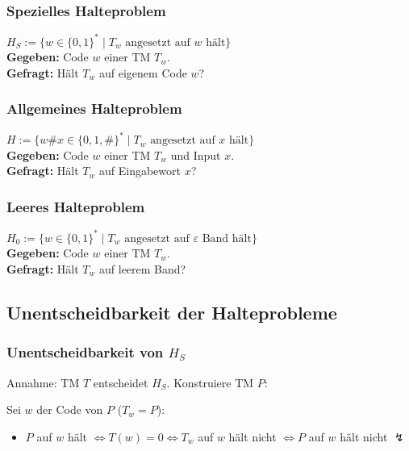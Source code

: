 \subsubsection{Spezielles Halteproblem}
$H_S := \{w \in \{0,1\}^* \mid T_w \text{ angesetzt auf } w \text{ hält}\}$\\
\textbf{Gegeben:} Code $w$ einer TM $T_w$. \\
\textbf{Gefragt:} Hält $T_w$ auf eigenem Code $w$?

\subsubsection{Allgemeines Halteproblem}
$H := \{w\#x \in \{0,1,\#\}^* \mid T_w \text{ angesetzt auf } x \text{ hält}\}$\\
\textbf{Gegeben:} Code $w$ einer TM $T_w$ und Input $x$. \\
\textbf{Gefragt:} Hält $T_w$ auf Eingabewort $x$?

\subsubsection{Leeres Halteproblem}
$H_0 := \{w \in \{0,1\}^* \mid T_w \text{ angesetzt auf $\varepsilon$ Band hält}\}$\\
\textbf{Gegeben:} Code $w$ einer TM $T_w$. \\
\textbf{Gefragt:} Hält $T_w$ auf leerem Band?

\subsection{Unentscheidbarkeit der Halteprobleme}

\subsubsection{Unentscheidbarkeit von $H_S$}
Annahme: TM $T$ entscheidet $H_S$. Konstruiere TM $P$:
\begin{center}
\end{center}
Sei $w$ der Code von $P$ ($T_w = P$):
\begin{itemize}
    \item $P$ auf $w$ hält $\Leftrightarrow T(w)=0 \Leftrightarrow T_w$ auf $w$ hält nicht $\Leftrightarrow P$ auf $w$ hält nicht $\lightning$
\end{itemize}

